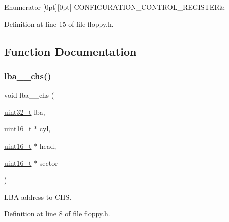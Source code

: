 \begin{DoxyEnumFields}{Enumerator}
[0pt][0pt]{}\mbox{\label{a00017_a203a664e6f1b58c27efb4db8ff9db144_a203a664e6f1b58c27efb4db8ff9db144a109e7c2d2104dc338c02288846bd0d73}} 
C\+O\+N\+F\+I\+G\+U\+R\+A\+T\+I\+O\+N\+\_\+\+C\+O\+N\+T\+R\+O\+L\+\_\+\+R\+E\+G\+I\+S\+T\+ER&\\
\hline

\end{DoxyEnumFields}


Definition at line 15 of file floppy.\+h.



\subsection{Function Documentation}
\mbox{\label{a00017_a782ff57a4ec7786197ec3a12d4f52332_a782ff57a4ec7786197ec3a12d4f52332}} 
\subsubsection{\texorpdfstring{lba\+\_\+\_\+chs()}{lba\_2\_chs()}}
{\footnotesize\ttfamily void lba\+\_\+\_\+chs (\begin{DoxyParamCaption}\item[{\hyperlink{a00038_a435d1572bf3f880d55459d9805097f62_a435d1572bf3f880d55459d9805097f62}{uint32\+\_\+t}}]{lba,  }\item[{\hyperlink{a00038_adf4d876453337156dde61095e1f20223_adf4d876453337156dde61095e1f20223}{uint16\+\_\+t} $\ast$}]{cyl,  }\item[{\hyperlink{a00038_adf4d876453337156dde61095e1f20223_adf4d876453337156dde61095e1f20223}{uint16\+\_\+t} $\ast$}]{head,  }\item[{\hyperlink{a00038_adf4d876453337156dde61095e1f20223_adf4d876453337156dde61095e1f20223}{uint16\+\_\+t} $\ast$}]{sector }\end{DoxyParamCaption})}



L\+BA address to C\+HS. 



Definition at line 8 of file floppy.\+h.

